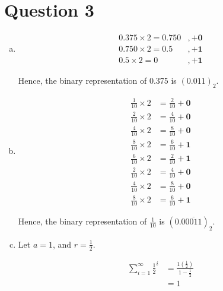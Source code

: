 \documentclass[12pt]{article}
\begin{document}
\section*{Question 3}
\begin{enumerate}[a.]
    \item

    \begin{align*}
        0.375 \times 2 = 0.750 &, + \textbf{0}\\
        0.750 \times 2 = 0.5 &, + \textbf{1}\\
        0.5 \times 2 = 0 &, + \textbf{1}
    \end{align*}

    Hence, the binary representation of 0.375 is $(0.011)_2$.

    \item

    \begin{align*}
        \frac{1}{10} \times 2 &= \frac{2}{10} + \textbf{0}\\
        \frac{2}{10} \times 2 &= \frac{4}{10} + \textbf{0}\\
        \frac{4}{10} \times 2 &= \frac{8}{10} + \textbf{0}\\
        \frac{8}{10} \times 2 &= \frac{6}{10} + \textbf{1}\\
        \frac{6}{10} \times 2 &= \frac{2}{10} + \textbf{1}\\
        \frac{2}{10} \times 2 &= \frac{4}{10} + \textbf{0}\\
        \frac{4}{10} \times 2 &= \frac{8}{10} + \textbf{0}\\
        \frac{8}{10} \times 2 &= \frac{6}{10} + \textbf{1}
    \end{align*}

    Hence, the binary representation of $\frac{1}{10}$ is $(0.0\overline{0011})_2$.

    \item

    Let $a = 1$, and $r = \frac{1}{2}$.

    \bigskip
    \setcounter{equation}{0}
    \begin{align}
        \sum\limits_{i=1}^{\infty} \frac{1}{2}^i &= \frac{1(\frac{1}{2})}{1 - \frac{1}{2}}\\
        &= 1
    \end{align}

\end{enumerate}
\end{document}
